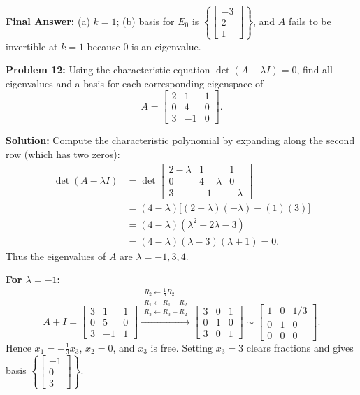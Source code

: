 \documentclass[11pt, letterpaper]{article}
\theoremstyle{definition}
\theoremstyle{remark}
\begin{document}
\textbf{Final Answer:} (a) $k = 1$; (b) basis for $E_0$ is $\left\{ \begin{bmatrix} -3 \\ 2 \\ 1 \end{bmatrix} \right\}$, and $A$ fails to be invertible at $k = 1$ because $0$ is an eigenvalue.

\vspace{0.4em}
\textbf{Problem 12:}
Using the characteristic equation $\det(A - \lambda I) = 0$, find all eigenvalues and a basis for each corresponding eigenspace of
\[
A = \begin{bmatrix} 2 & 1 & 1 \\ 0 & 4 & 0 \\ 3 & -1 & 0 \end{bmatrix}.
\]

\textbf{Solution:}
Compute the characteristic polynomial by expanding along the second row (which has two zeros):
\begin{align*}
\det(A - \lambda I) &= \det \begin{bmatrix} 2 - \lambda & 1 & 1 \\ 0 & 4 - \lambda & 0 \\ 3 & -1 & -\lambda \end{bmatrix} \\
&= (4 - \lambda)\bigl[(2 - \lambda)(-\lambda) - (1)(3)\bigr] \\
&= (4 - \lambda)(\lambda^2 - 2\lambda - 3) \\
&= (4 - \lambda)(\lambda - 3)(\lambda + 1) = 0.
\end{align*}
Thus the eigenvalues of $A$ are $\lambda = -1, 3, 4$.

\textbf{For $\lambda = -1$:}
\[
A + I = \begin{bmatrix} 3 & 1 & 1 \\ 0 & 5 & 0 \\ 3 & -1 & 1 \end{bmatrix}
\xrightarrow{\substack{R_2 \leftarrow \frac{1}{5}R_2 \\ R_1 \leftarrow R_1 - R_2 \\ R_3 \leftarrow R_3 + R_2}}
\begin{bmatrix} 3 & 0 & 1 \\ 0 & 1 & 0 \\ 3 & 0 & 1 \end{bmatrix}
\sim
\begin{bmatrix} 1 & 0 & 1/3 \\ 0 & 1 & 0 \\ 0 & 0 & 0 \end{bmatrix}.
\]
Hence $x_1 = -\frac{1}{3}x_3$, $x_2 = 0$, and $x_3$ is free. Setting $x_3 = 3$ clears fractions and gives basis $\left\{ \begin{bmatrix} -1 \\ 0 \\ 3 \end{bmatrix} \right\}$.
\end{document}
